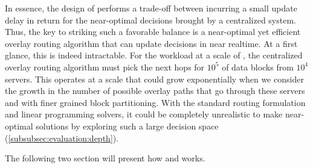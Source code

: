 In essence, the design of \name performs a trade-off between incurring
a small update delay in return for the near-optimal
decisions brought by a centralized system. Thus, the key to striking such a
favorable balance is a near-optimal yet efficient overlay routing
algorithm that can update decisions in near realtime. At a first
glance, this is indeed intractable. For the workload at a scale of
\company, the centralized overlay routing algorithm must pick the next
hops for $10^5$ of data blocks from $10^4$ servers. This operates at a scale that
could grow exponentially when we consider the growth in the number of possible
overlay paths that go through these servers and with finer grained
block partitioning. With the standard routing formulation and linear
programming solvers, it could be completely unrealistic to make
near-optimal solutions by exploring such a large decision space
(\Section\ref{subsubsec:evaluation:depth}).


The following two section will present how \name and \newname works.

